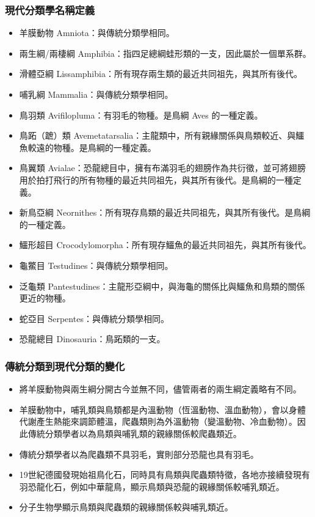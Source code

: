 \documentclass[a4paper,12pt]{report}
\begin{document}
\subsubsection{現代分類學名稱定義}
\begin{itemize}
\item 羊膜動物 Amniota：與傳統分類學相同。
\item 兩生綱/兩棲綱 Amphibia：指四足總綱蛙形類的一支，因此屬於一個單系群。
\item 滑體亞綱 Lissamphibia：所有現存兩生類的最近共同祖先，與其所有後代。
\item 哺乳綱 Mammalia：與傳統分類學相同。
\item 鳥羽類 Avifilopluma：有羽毛的物種。是鳥綱 Aves 的一種定義。
\item 鳥跖（蹠）類 Avemetatarsalia：主龍類中，所有親緣關係與鳥類較近、與鱷魚較遠的物種。是鳥綱的一種定義。
\item 鳥翼類 Avialae：恐龍總目中，擁有布滿羽毛的翅膀作為共衍徵，並可將翅膀用於拍打飛行的所有物種的最近共同祖先，與其所有後代。是鳥綱的一種定義。
\item 新鳥亞綱 Neornithes：所有現存鳥類的最近共同祖先，與其所有後代。是鳥綱的一種定義。
\item 鱷形超目 Crocodylomorpha：所有現存鱷魚的最近共同祖先，與其所有後代。
\item 龜鱉目 Testudines：與傳統分類學相同。
\item 泛龜類 Pantestudines：主龍形亞綱中，與海龜的關係比與鱷魚和鳥類的關係更近的物種。
\item 蛇亞目 Serpentes：與傳統分類學相同。
\item 恐龍總目 Dinosauria：鳥跖類的一支。
\end{itemize}
\subsubsection{傳統分類到現代分類的變化}
\begin{itemize}
\item 將羊膜動物與兩生綱分開古今並無不同，儘管兩者的兩生綱定義略有不同。
\item 羊膜動物中，哺乳類與鳥類都是內溫動物（恆溫動物、溫血動物），會以身體代謝產生熱能來調節體溫，爬蟲類則為外溫動物（變溫動物、冷血動物）。因此傳統分類學者以為鳥類與哺乳類的親緣關係較爬蟲類近。
\item 傳統分類學者以為爬蟲類不具羽毛，實則部分恐龍也具有羽毛。
\item 19世紀德國發現始祖鳥化石，同時具有鳥類與爬蟲類特徵，各地亦接續發現有羽恐龍化石，例如中華龍鳥，顯示鳥類與恐龍的親緣關係較哺乳類近。
\item 分子生物學顯示鳥類與爬蟲類的親緣關係較與哺乳類近。
\end{itemize}
\end{document}
